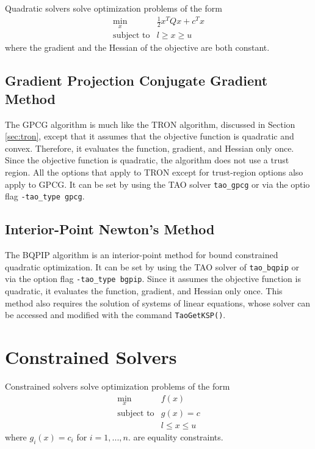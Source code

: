 \documentclass[]{book}
\begin{document}
Quadratic solvers solve optimization problems of the form
\[
\begin{array}{ll}
\displaystyle \min_{x} & \frac{1}{2}x^T Q x + c^T x \\
\mbox{subject to} & l \geq x \geq u
\end{array}
\]
where the gradient and the Hessian of the objective are both constant.

\subsection{Gradient Projection Conjugate Gradient Method}
The GPCG \cite{more-toraldo} algorithm is much like the TRON algorithm, discussed in
Section \ref{sec:tron}, except that
it assumes that the objective function is quadratic and convex.
Therefore, it evaluates the function, gradient, and Hessian only
once.
Since the objective function
is quadratic, the algorithm does not use a trust region.  
All the options that apply to TRON except for trust-region
options also apply to GPCG. It can be set by using the TAO solver 
{\tt tao\_gpcg} or via the optio flag {\tt -tao\_type gpcg}.

\subsection{Interior-Point Newton's Method}\label{sec:bqpip}
The BQPIP algorithm is an interior-point method for bound
constrained quadratic optimization.  It can be set by using the
TAO solver of {\tt tao\_bqpip} or via the option flag {\tt -tao\_type bgpip}.
Since it assumes the objective function is quadratic, 
it evaluates the function, gradient, and Hessian only once.
This method also requires the solution of systems of linear equations,
whose solver can be accessed and modified 
with the command {\tt Tao\-Get\-KSP()}.

\section{Constrained Solvers}

Constrained solvers solve optimization problems of the form
\[
\begin{array}{ll}
\displaystyle \min_{x} & f(x) \\
\mbox{subject to} & g(x) = c \\
                  & l \leq x \leq u
\end{array}
\]
where $g_i(x) = c_i$ for $i = 1,...,n$. are equality constraints.
\end{document}
